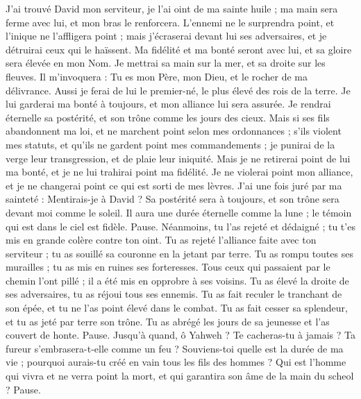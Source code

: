 \begin{multicols}{2}
J'ai trouvé David mon serviteur, je l'ai oint de ma sainte huile ;
ma main sera ferme avec lui, et mon bras le renforcera.
L'ennemi ne le surprendra point, et l'inique ne l'affligera point ;
mais j’écraserai devant lui ses adversaires, et je détruirai ceux qui le haïssent.
Ma fidélité et ma bonté seront avec lui, et sa gloire sera élevée en mon Nom.
Je mettrai sa main sur la mer, et sa droite sur les fleuves.
Il m'invoquera : Tu es mon Père, mon Dieu, et le rocher de ma délivrance.
Aussi je ferai de lui le premier-né, le plus élevé des rois de la terre.
Je lui garderai ma bonté à toujours, et mon alliance lui sera assurée.
Je rendrai éternelle sa postérité, et son trône comme les jours des cieux.
Mais si ses fils abandonnent ma loi, et ne marchent point selon mes ordonnances ;
s'ils violent mes statuts, et qu'ils ne gardent point mes commandements ;
je punirai de la verge leur transgression, et de plaie leur iniquité.
Mais je ne retirerai point de lui ma bonté, et je ne lui trahirai point ma fidélité.
Je ne violerai point mon alliance, et je ne changerai point ce qui est sorti de mes lèvres.
J'ai une fois juré par ma sainteté : Mentirais-je à David ?
Sa postérité sera à toujours, et son trône sera devant moi comme le soleil.
Il aura une durée éternelle comme la lune ; le témoin qui est dans le ciel est fidèle. Pause.
Néanmoins, tu l'as rejeté et dédaigné ; tu t'es mis en grande colère contre ton oint.
Tu as rejeté l'alliance faite avec ton serviteur ; tu as souillé sa couronne en la jetant par terre.
Tu as rompu toutes ses murailles ; tu as mis en ruines ses forteresses.
Tous ceux qui passaient par le chemin l'ont pillé ; il a été mis en opprobre à ses voisins.
Tu as élevé la droite de ses adversaires, tu as réjoui tous ses ennemis.
Tu as fait reculer le tranchant de son épée, et tu ne l'as point élevé dans le combat.
Tu as fait cesser sa splendeur, et tu as jeté par terre son trône.
Tu as abrégé les jours de sa jeunesse et l'as couvert de honte. Pause.
Jusqu’à quand, ô Yahweh ? Te cacheras-tu à jamais ? Ta fureur s'embrasera-t-elle comme un feu ?
Souviens-toi quelle est la durée de ma vie ; pourquoi aurais-tu créé en vain tous les fils des hommes ?
Qui est l'homme qui vivra et ne verra point la mort, et qui garantira son âme de la main du scheol ? Pause.

\end{multicols}
